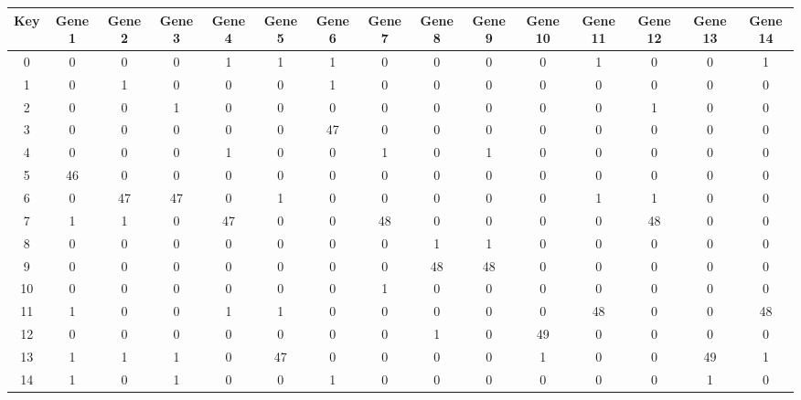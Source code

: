 \begin{tabular}{|c|c|c|c|c|c|c|c|c|c|c|c|c|c|c|}
\hline
Key & Gene 1 & Gene 2 & Gene 3 & Gene 4 & Gene 5 & Gene 6 & Gene 7 & Gene 8 & Gene 9 & Gene 10 & Gene 11 & Gene 12 & Gene 13 & Gene 14 \\
\hline
0 & 0 & 0 & 0 & 1 & 1 & 1 & 0 & 0 & 0 & 0 & 1 & 0 & 0 & 1 \\
1 & 0 & 1 & 0 & 0 & 0 & 1 & 0 & 0 & 0 & 0 & 0 & 0 & 0 & 0 \\
2 & 0 & 0 & 1 & 0 & 0 & 0 & 0 & 0 & 0 & 0 & 0 & 1 & 0 & 0 \\
3 & 0 & 0 & 0 & 0 & 0 & 47 & 0 & 0 & 0 & 0 & 0 & 0 & 0 & 0 \\
4 & 0 & 0 & 0 & 1 & 0 & 0 & 1 & 0 & 1 & 0 & 0 & 0 & 0 & 0 \\
5 & 46 & 0 & 0 & 0 & 0 & 0 & 0 & 0 & 0 & 0 & 0 & 0 & 0 & 0 \\
6 & 0 & 47 & 47 & 0 & 1 & 0 & 0 & 0 & 0 & 0 & 1 & 1 & 0 & 0 \\
7 & 1 & 1 & 0 & 47 & 0 & 0 & 48 & 0 & 0 & 0 & 0 & 48 & 0 & 0 \\
8 & 0 & 0 & 0 & 0 & 0 & 0 & 0 & 1 & 1 & 0 & 0 & 0 & 0 & 0 \\
9 & 0 & 0 & 0 & 0 & 0 & 0 & 0 & 48 & 48 & 0 & 0 & 0 & 0 & 0 \\
10 & 0 & 0 & 0 & 0 & 0 & 0 & 1 & 0 & 0 & 0 & 0 & 0 & 0 & 0 \\
11 & 1 & 0 & 0 & 1 & 1 & 0 & 0 & 0 & 0 & 0 & 48 & 0 & 0 & 48 \\
12 & 0 & 0 & 0 & 0 & 0 & 0 & 0 & 1 & 0 & 49 & 0 & 0 & 0 & 0 \\
13 & 1 & 1 & 1 & 0 & 47 & 0 & 0 & 0 & 0 & 1 & 0 & 0 & 49 & 1 \\
14 & 1 & 0 & 1 & 0 & 0 & 1 & 0 & 0 & 0 & 0 & 0 & 0 & 1 & 0 \\
\hline
\end{tabular}